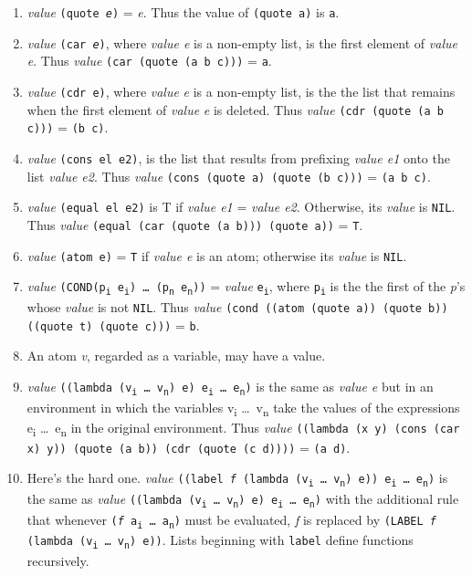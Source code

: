 \documentclass[8pt,letter,twocolumn]{article}
\newcommand{\args}[1] {#1\textsubscript{i} \dots \ #1\textsubscript{n}}
\newcommand{\ei}[0] {e\textsubscript{i}}
\newcommand{\en}[0] {e\textsubscript{n}}
\begin{document}
\begin{enumerate}
\setlength\itemsep{0em}
\item \textit{value} \texttt{(quote \textit{e})} = \textit{e}. Thus the value of
  \texttt{(quote a)} is \texttt{a}.

\item \textit{value} \texttt{(car \textit{e})}, where \textit{value e} is a
  non-empty list, is the first element of \textit{value e}. Thus \textit{value}
  \texttt{(car (quote (a b c)))} = \texttt{a}.

\item \textit{value} \texttt{(cdr e)}, where \textit{value} \textit{e} is a
  non-empty list, is the the list that remains when the first element of
  \textit{value} \textit{e} is deleted. Thus \textit{value} \texttt{(cdr (quote
    (a b c)))} = \texttt{(b c)}.

\item \textit{value} \texttt{(cons el e2)}, is the list that results from
  prefixing \textit{value e1} onto the list \textit{value e2}. Thus
  \textit{value} \texttt{(cons (quote a) (quote (b c)))} = \texttt{(a b c)}.

\item \textit{value} \texttt{(equal el e2)} is T if \textit{value e1} =
  \textit{value e2}. Otherwise, its \textit{value} is \texttt{NIL}. Thus
  \textit{value} \texttt{(equal (car (quote (a b))) (quote a))} = \texttt{T}.

\item \textit{value} \texttt{(atom e)} = \texttt{T} if \textit{value e} is an
  atom; otherwise its \textit{value} is \texttt{NIL}.

\item \textit{value} \texttt{(COND(p\textsubscript{i} \ei) \dots
    (p\textsubscript{n} \en))} = \textit{value} \texttt{\ei}, where
  \texttt{p\textsubscript{i}} is the the first of the \textit{p}\rq s whose
  \textit{value} is not \texttt{NIL}. Thus \textit{value} \texttt{(cond ((atom
    (quote a)) (quote b)) ((quote t) (quote c)))} = \texttt{b}.

\item An atom \textit{v}, regarded as a variable, may have a value.

\item \textit{value} \texttt{((lambda (\args{v}) e) \args{e})} is the same as
  \textit{value e} but in an environment in which the variables \args{v} take
  the values of the expressions \args{e} in the original environment. Thus
  \textit{value} \texttt{((lambda (x y) (cons (car x) y)) (quote (a b)) (cdr
    (quote (c d))))} = \texttt{(a d)}.

\item Here\rq s the hard one. \textit{value} \texttt{((label \textit{f} (lambda
    (\args{v}) e)) \args{e})} is the same as \textit{value} \texttt{((lambda
    (\args{v}) e) \args{e})} with the additional rule that whenever
  \texttt{(\textit{f} \args{a})} must be evaluated, \textit{f} is replaced by
  \texttt{(LABEL \textit{f} (lambda (\args{v}) e))}. Lists beginning with
  \texttt{label} define functions recursively.

\end{enumerate}
\end{document}
